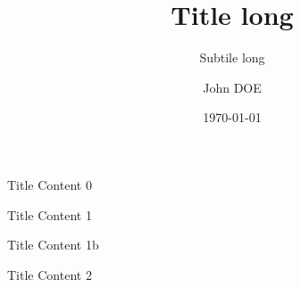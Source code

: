 \documentclass[notheorems, noamsthm, aspectratio=169, 10pt]{beamer}
\title[shorttitle]{Title long}
\subtitle[shortsubtitle]{Subtile long}
\date[shortdate]{\today}
\author[john.doe@mail.com]{John DOE\inst{1}}
\institute[shortinstitute]{\inst{1} An Awesome Company}
\begin{document}

   \begin{frame}{Title}
      Content 0
   \end{frame}

   {
   \begin{frame}{Title}
      Content 1
   \end{frame}

   \begin{frame}{Title}
      Content 1b
   \end{frame}

   }

   \begin{frame}{Title}
      Content 2
   \end{frame}
\end{document}
